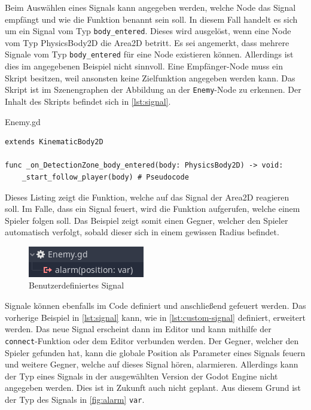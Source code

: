 Beim Auswählen eines Signals kann angegeben werden, welche Node das Signal empfängt und wie die Funktion benannt sein soll.
In diesem Fall handelt es sich um ein Signal vom Typ \texttt{body\_entered}.
Dieses wird ausgelöst, wenn eine Node vom Typ PhysicsBody2D die Area2D betritt.
Es sei angemerkt, dass mehrere Signale vom Typ \texttt{body\_entered} für eine Node existieren können.
Allerdings ist dies im angegebenen Beispiel nicht sinnvoll.
Eine Empfänger-Node muss ein Skript besitzen, weil ansonsten keine Zielfunktion angegeben werden kann.
Das Skript ist im Szenengraphen der Abbildung an der \texttt{Enemy}-Node zu erkennen.
Der Inhalt des Skripts befindet sich in \autoref{lst:signal}.\\

\begin{listing}[H]
	\caption{Enemy.gd}
	\label{lst:signal}
	\begin{verbatim}
extends KinematicBody2D

func _on_DetectionZone_body_entered(body: PhysicsBody2D) -> void:
	_start_follow_player(body) # Pseudocode
\end{verbatim}
\end{listing}

Dieses Listing zeigt die Funktion, welche auf das Signal der Area2D reagieren soll.
Im Falle, dass ein Signal feuert, wird die Funktion aufgerufen, welche einem Spieler folgen soll.
Das Beispiel zeigt somit einen Gegner, welcher den Spieler automatisch verfolgt, sobald dieser sich in einem gewissen Radius befindet.\\

\begin{figure}[H]
	\centering
	\includegraphics[width=0.4\columnwidth]{figures/screenshots/custom-signal.png}
	\caption{\label{fig:alarm} Benutzerdefiniertes Signal}
\end{figure}

Signale können ebenfalls im Code definiert und anschließend gefeuert werden.
Das vorherige Beispiel in \autoref{lst:signal} kann, wie in \autoref{lst:custom-signal} definiert, erweitert werden.
Das neue Signal erscheint dann im Editor und kann mithilfe der \texttt{connect}-Funktion oder dem Editor verbunden werden.
Der Gegner, welcher den Spieler gefunden hat, kann die globale Position als Parameter eines Signals feuern und weitere Gegner, welche auf dieses Signal hören, alarmieren.
Allerdings kann der Typ eines Signals in der ausgewählten Version der Godot Engine nicht angegeben werden.
Dies ist in Zukunft auch nicht geplant\cite{godot-signal-type}.
Aus diesem Grund ist der Typ des Signals in \autoref{fig:alarm} \texttt{var}.\\

